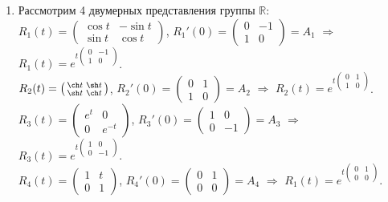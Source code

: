 \documentclass[a4paper]{article}
\begin{document}
\prim
\begin{enumerate}
  \item Рассмотрим 4 двумерных представления группы $\mathbb{R}$:\\
  $R_1(t)=\left(\begin{smallmatrix} \cos t& -\sin t\\ \sin t& \cos t
  \end{smallmatrix}\right)$, $R_1'(0)=\left(\begin{smallmatrix} 0& -1\\ 1&
  0\end{smallmatrix}\right)=A_1$ $\Rightarrow$ $R_1(t)=e^{t\left(\begin{smallmatrix}
  0& -1\\ 1& 0\end{smallmatrix}\right)}$.\\
  $R_2(t)=\left(\begin{smallmatrix} \ch t& \sh t\\ \sh t& \ch t
  \end{smallmatrix}\right)$, $R_2'(0)=\left(\begin{smallmatrix} 0& 1\\ 1&
  0\end{smallmatrix}\right)=A_2$ $\Rightarrow$ $R_2(t)=e^{t\left(\begin{smallmatrix}
  0& 1\\ 1& 0\end{smallmatrix}\right)}$.\\
  $R_3(t)=\left(\begin{smallmatrix} e^t& 0\\ 0& e^{-t}
  \end{smallmatrix}\right)$, $R_3'(0)=\left(\begin{smallmatrix} 1& 0\\ 0&
  -1\end{smallmatrix}\right)=A_3$ $\Rightarrow$ $R_3(t)=e^{t\left(\begin{smallmatrix}
  1& 0\\ 0& -1\end{smallmatrix}\right)}$.\\
  $R_4(t)=\left(\begin{smallmatrix} 1& t\\ 0& 1
  \end{smallmatrix}\right)$, $R_4'(0)=\left(\begin{smallmatrix} 0& 1\\ 0&
  0\end{smallmatrix}\right)=A_4$ $\Rightarrow$ $R_1(t)=e^{t\left(\begin{smallmatrix}
  0& 1\\ 0& 0\end{smallmatrix}\right)}$.
\end{enumerate}
\end{document}

